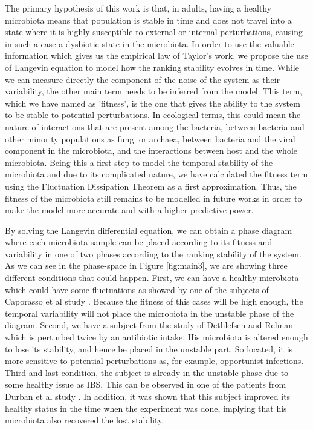 The primary hypothesis of this work is that, in adults, having a healthy microbiota means that population is stable in time and does not travel into a state where it is highly susceptible to external or internal perturbations, causing in such a case a dysbiotic state in the microbiota. In order to use the valuable information which gives us the empirical law of Taylor's work, we propose the use of Langevin equation to model how the ranking stability evolves in time. While we can measure directly the component of the noise of the system as their variability, the other main term needs to be inferred from the model. This term, which we have named as 'fitness', is the one that gives the ability to the system to be stable to potential perturbations. In ecological terms, this could mean the nature of interactions that are present among the bacteria, between bacteria and other minority populations as fungi or archaea, between bacteria and the viral component in the microbiota, and the interactions between host and the whole microbiota. Being this a first step to model the temporal stability of the microbiota and due to its complicated nature, we have calculated the fitness term using the Fluctuation Dissipation Theorem as a first approximation\cite{FD}. Thus, the fitness of the microbiota still remains to be modelled in future works in order to make the model more accurate and with a higher predictive power. 

By solving the Langevin differential equation, we can obtain a phase diagram where each microbiota sample can be placed according to its fitness and variability in one of two phases according to the ranking stability of the system. As we can see in the phase-space in Figure \ref{fig:main3}, we are showing three different conditions that could happen. First, we can have a healthy microbiota which could have some fluctuations as showed by one of the subjects of Caporasso et al study \cite{moving}. Because the fitness of this cases will be high enough, the temporal variability will not place the microbiota in the unstable phase of the diagram. Second, we have a subject from the study of Dethlefsen and Relman \cite{antibiotic} which is perturbed twice by an antibiotic intake. His microbiota is altered enough to lose its stability, and hence be placed in the unstable part. So located, it is more sensitive to potential perturbations as, for example, opportunist infections. Third and last condition, the subject is already in the unstable phase due to some healthy issue as IBS. This can be observed in one of the patients from Durban et al study \cite{IBS}. In addition, it was shown that this subject improved its healthy status in the time when the experiment was done, implying that his microbiota also recovered the lost stability. 
 
